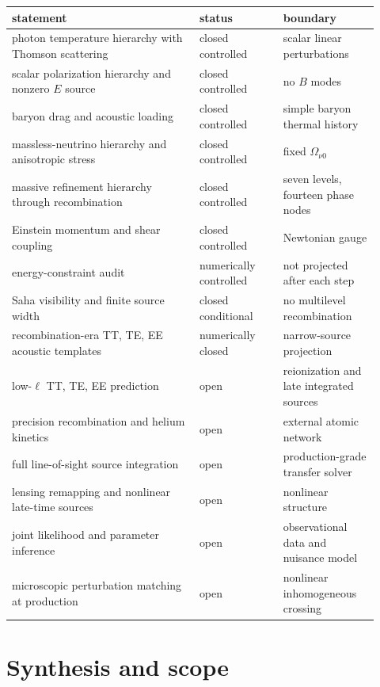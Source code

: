 \begin{center}
\begin{tabular}{>{\raggedright\arraybackslash}p{0.47\linewidth}>{\raggedright\arraybackslash}p{0.21\linewidth}>{\raggedright\arraybackslash}p{0.24\linewidth}}
\toprule
statement & status & boundary\\
\midrule
photon temperature hierarchy with Thomson scattering & closed controlled & scalar linear perturbations\\
scalar polarization hierarchy and nonzero $E$ source & closed controlled & no $B$ modes\\
baryon drag and acoustic loading & closed controlled & simple baryon thermal history\\
massless-neutrino hierarchy and anisotropic stress & closed controlled & fixed $\Omega_{\nu0}$\\
massive refinement hierarchy through recombination & closed controlled & seven levels, fourteen phase nodes\\
Einstein momentum and shear coupling & closed controlled & Newtonian gauge\\
energy-constraint audit & numerically controlled & not projected after each step\\
Saha visibility and finite source width & closed conditional & no multilevel recombination\\
recombination-era TT, TE, EE acoustic templates & numerically closed & narrow-source projection\\
low-$\ell$ TT, TE, EE prediction & open & reionization and late integrated sources\\
precision recombination and helium kinetics & open & external atomic network\\
full line-of-sight source integration & open & production-grade transfer solver\\
lensing remapping and nonlinear late-time sources & open & nonlinear structure\\
joint likelihood and parameter inference & open & observational data and nuisance model\\
microscopic perturbation matching at production & open & nonlinear inhomogeneous crossing\\
\bottomrule
\end{tabular}
\end{center}

\clearpage
\section{Synthesis and scope}

